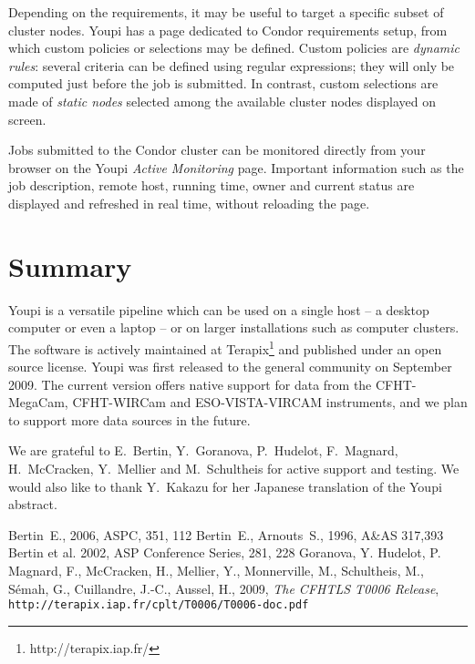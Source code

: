 \documentclass[11pt,twoside]{article}  %
\begin{document}
Depending on the requirements, it may be useful to target a specific subset of cluster 
nodes. Youpi has a page dedicated to Condor requirements setup, from which custom policies or
selections may be defined. Custom policies are \emph{dynamic rules}: several criteria can be 
defined using regular expressions; they will only be computed just before the job is
submitted. In contrast, custom selections are made of \emph{static nodes} 
selected among the available cluster nodes displayed on screen.

Jobs submitted to the Condor cluster can be monitored directly from your browser on the
Youpi \emph{Active Monitoring} page. Important information such as the job 
description, remote host, running time, owner and current status are displayed and refreshed 
in real time, without reloading the page.

\section{Summary}

Youpi is a versatile pipeline which can be used on a single host -- a desktop computer or even 
a laptop -- or on larger installations such as computer clusters. The software is actively maintained
at Terapix\footnote{http://terapix.iap.fr/} and published under an 
open source license. Youpi was first released to the general community on September 2009.
The current version offers
native support for data from the CFHT-MegaCam, CFHT-WIRCam and ESO-VISTA-VIRCAM instruments,
and we plan to support more data sources in the future. 

\acknowledgments

We are grateful to E.\ Bertin, Y.\ Goranova, P.\ Hudelot, F.\ Magnard, H.\ McCracken, Y.\ Mellier and 
M.\ Schultheis for active support and testing. We would also like to thank Y.\ Kakazu for her Japanese
translation of the Youpi abstract.

\begin{references}

 Bertin~E., 2006, ASPC, 351, 112
 Bertin~E., Arnouts~S., 1996, A\&AS 317,393
 Bertin et al. 2002, ASP Conference Series, 281, 228
 Goranova, Y. Hudelot, P. Magnard, F., McCracken, H.,
 Mellier, Y., Monnerville, M., Schultheis, M., S\'emah, G., Cuillandre, J.-C., Aussel, H., 2009, {\it The CFHTLS T0006 Release},
 {\tt http://terapix.iap.fr/cplt/T0006/T0006-doc.pdf}\\
    
\end{references}

\end{document}
